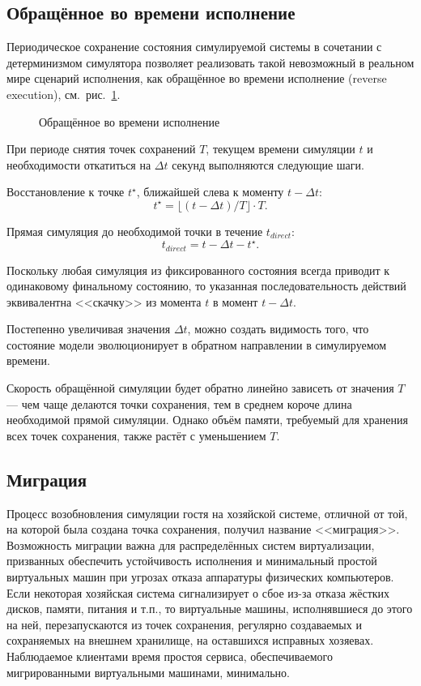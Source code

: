 \subsection[Обращение во времени]{Обращённое во времени исполнение}\label{revexec}

Периодическое сохранение состояния симулируемой системы в сочетании с детерминизмом симулятора позволяет реализовать такой невозможный в реальном мире сценарий исполнения, как обращённое во времени исполнение (\abbr reverse execution), см.~рис.~\ref{fig:reverse-execution}. 

\begin{figure}[htb]
    \centering
    \caption{Обращённое во времени исполнение}
    \label{fig:reverse-execution}
\end{figure}

При периоде снятия точек сохранений $T$, текущем времени симуляции $t$  и необходимости откатиться на $\Delta t$ секунд выполняются следующие шаги.

\begin{enumerate*}
    \item Восстановление к точке $t^\star$, ближайшей слева к моменту $t-\Delta t$:
    $$ t^\star = \lfloor (t - \Delta t) / T \rfloor \cdot T. $$
    \item Прямая симуляция до необходимой точки в течение $t_{direct}$:
    $$t_{direct} = t - \Delta t - t^\star .$$
\end{enumerate*}

Поскольку любая симуляция из фиксированного состояния всегда приводит к одинаковому финальному состоянию, то указанная последовательность действий эквивалентна <<скачку>> из момента $t$ в момент $t - \Delta t$.

Постепенно увеличивая значения $\Delta t$, можно создать видимость того, что состояние модели эволюционирует в обратном направлении в симулируемом времени. 

Скорость обращённой симуляции будет обратно линейно зависеть от значения $T$ — чем чаще делаются точки сохранения, тем в среднем короче длина необходимой прямой симуляции. Однако объём памяти, требуемый для хранения всех точек сохранения, также растёт с уменьшением $T$.

\subsection{Миграция}

Процесс возобновления симуляции гостя на хозяйской системе, отличной от той, на которой была создана точка сохранения, получил название <<миграция>>. Возможность миграции важна для распределённых систем виртуализации, призванных обеспечить устойчивость исполнения и минимальный простой виртуальных машин при угрозах отказа аппаратуры физических компьютеров. Если некоторая хозяйская система сигнализирует о сбое из-за отказа жёстких дисков, памяти, питания и т.п., то виртуальные машины, исполнявшиеся до этого на ней, перезапускаются из точек сохранения, регулярно создаваемых и сохраняемых на внешнем хранилище, на оставшихся исправных хозяевах. Наблюдаемое клиентами время простоя сервиса, обеспечиваемого мигрированными виртуальными машинами, минимально.

